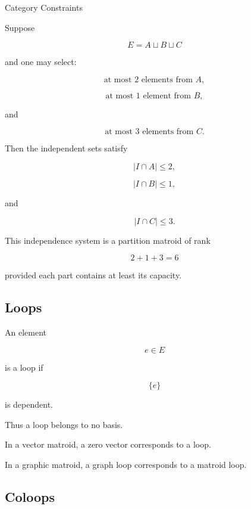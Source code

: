 \begin{workedexamplebox}{Category Constraints}

Suppose

\[
E=A\sqcup B\sqcup C
\]

and one may select:

\[
\text{at most }2\text{ elements from }A,
\]

\[
\text{at most }1\text{ element from }B,
\]

and

\[
\text{at most }3\text{ elements from }C.
\]

Then the independent sets satisfy

\[
|I\cap A|\leq2,
\]

\[
|I\cap B|\leq1,
\]

and

\[
|I\cap C|\leq3.
\]

\begin{answerbox}
This independence system is a partition matroid of rank

\[
\boxed{
2+1+3=6
}
\]

provided each part contains at least its capacity.
\end{answerbox}

\end{workedexamplebox}

\subsection{Loops}
\label{subsec:matroid-loops}

An element

\[
e\in E
\]

is a loop if

\[
\boxed{
\{e\}
}
\]

is dependent.

Thus a loop belongs to no basis.

In a vector matroid, a zero vector corresponds to a loop.

In a graphic matroid, a graph loop corresponds to a matroid loop.

\subsection{Coloops}
\label{subsec:matroid-coloops}

